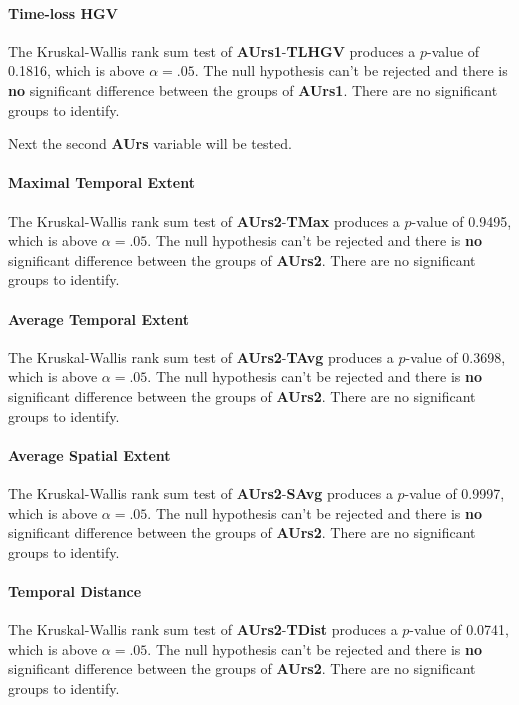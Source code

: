 \paragraph{Time-loss HGV}
The Kruskal-Wallis rank sum test of \textbf{AUrs1}-\textbf{TLHGV} produces a $p$-value of 0.1816, which is above $\alpha=.05$. The null hypothesis can't be rejected and there is \textbf{no} significant difference between the groups of \textbf{AUrs1}. There are no significant groups to identify.

\medskip
Next the second \textbf{AUrs} variable will be tested.
\medskip

\paragraph{Maximal Temporal Extent}
The Kruskal-Wallis rank sum test of \textbf{AUrs2}-\textbf{TMax} produces a $p$-value of 0.9495, which is above $\alpha=.05$. The null hypothesis can't be rejected and there is \textbf{no} significant difference between the groups of \textbf{AUrs2}. There are no significant groups to identify.

\paragraph{Average Temporal Extent}
The Kruskal-Wallis rank sum test of \textbf{AUrs2}-\textbf{TAvg} produces a $p$-value of 0.3698, which is above $\alpha=.05$. The null hypothesis can't be rejected and there is \textbf{no} significant difference between the groups of \textbf{AUrs2}. There are no significant groups to identify.

\paragraph{Average Spatial Extent}
The Kruskal-Wallis rank sum test of \textbf{AUrs2}-\textbf{SAvg} produces a $p$-value of 0.9997, which is above $\alpha=.05$. The null hypothesis can't be rejected and there is \textbf{no} significant difference between the groups of \textbf{AUrs2}. There are no significant groups to identify.

\paragraph{Temporal Distance}
The Kruskal-Wallis rank sum test of \textbf{AUrs2}-\textbf{TDist} produces a $p$-value of 0.0741, which is above $\alpha=.05$. The null hypothesis can't be rejected and there is \textbf{no} significant difference between the groups of \textbf{AUrs2}. There are no significant groups to identify.

